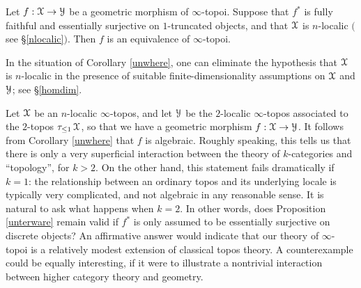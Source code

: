 \begin{corollary}\label{unwhere}
Let $f: \operatorname{\mathcal{X}} \rightarrow \operatorname{\mathcal{Y}}$ be a geometric morphism of $\infty$-topoi. Suppose that
$f^{\ast}$ is fully faithful and essentially surjective on $1$-truncated objects, and that
$\operatorname{\mathcal{X}}$ is $n$-localic $($see \S \ref{nlocalic}$)$. Then $f$ is an equivalence of $\infty$-topoi.
\end{corollary}

\begin{remark}
In the situation of Corollary \ref{unwhere}, one can eliminate the hypothesis that $\operatorname{\mathcal{X}}$ is $n$-localic in the presence of suitable finite-dimensionality assumptions on $\operatorname{\mathcal{X}}$ and $\operatorname{\mathcal{Y}}$; see \S \ref{homdim}.
\end{remark}

\begin{remark}
Let $\operatorname{\mathcal{X}}$ be an $n$-localic $\infty$-topos, and let $\operatorname{\mathcal{Y}}$ be the $2$-localic $\infty$-topos
associated to the $2$-topos $\tau_{\leq 1} \operatorname{\mathcal{X}}$, so that we have a geometric morphism
$f: \operatorname{\mathcal{X}} \rightarrow \operatorname{\mathcal{Y}}$. It follows from Corollary \ref{unwhere} that $f$ is algebraic.
Roughly speaking, this tells us that there is only a very superficial interaction between the theory of $k$-categories and ``topology'', for $k > 2$. On the other hand, this statement fails dramatically if
$k=1$: the relationship between an ordinary topos and its underlying locale is typically very complicated, and not algebraic in any reasonable sense. It is natural to ask what happens when $k=2$. In other words, does Proposition \ref{unterware} remain valid if $f^{\ast}$ is only assumed to be essentially surjective on discrete objects? An affirmative answer would indicate that our theory of $\infty$-topoi is a relatively modest extension of classical topos theory. A counterexample could be equally interesting, if it were to illustrate a nontrivial interaction between higher category theory and geometry.
\end{remark}